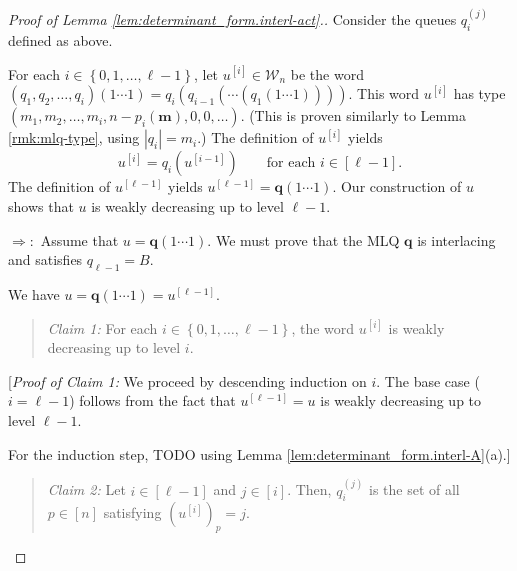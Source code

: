 \documentclass[reqno]{amsart}
\newcommand{\0}{\phantom{c}}
\newenvironment{statement}{\begin{quote}}{\end{quote}}
\theoremstyle{plain}
\theoremstyle{definition}
\numberwithin{equation}{section}
\begin{document}
\begin{proof}
[Proof of Lemma \ref{lem:determinant_form.interl-act}.]Consider the queues
$q_{i}^{\left(  j\right)  }$ defined as above.

For each $i\in\left\{  0,1,\ldots,\ell-1\right\}  $, let $u^{\left[  i\right]
}\in\mathcal{W}_{n}$ be the word $\left(  q_{1},q_{2},\ldots,q_{i}\right)
\left(  1\cdots1\right)  =q_{i}\left(  q_{i-1}\left(  \cdots\left(
q_{1}\left(  1\cdots1\right)  \right)  \right)  \right)  $. This word
$u^{\left[  i\right]  }$ has type $\left(  m_{1},m_{2},\ldots,m_{i}%
,n-p_{i}\left(  \mathbf{m}\right)  ,0,0,\ldots\right)  $. (This is proven
similarly to Lemma \ref{rmk:mlq-type}, using $\left\vert q_{i}\right\vert
=m_{i}$.) The definition of $u^{\left[  i\right]  }$ yields%
\begin{equation}
u^{\left[  i\right]  }=q_{i}\left(  u^{\left[  i-1\right]  }\right)
\qquad\text{for each }i\in\left[  \ell-1\right]
.\label{pf.lem:determinant_form.interl-act.rec}%
\end{equation}
The definition of $u^{\left[  \ell-1\right]  }$ yields $u^{\left[
\ell-1\right]  }=\mathbf{q}\left(  1\cdots1\right)  $. Our construction of $u$
shows that $u$ is weakly decreasing up to level $\ell-1$.

$\Longrightarrow:$ Assume that $u=\mathbf{q}\left(  1\cdots1\right)  $. We
must prove that the MLQ $\mathbf{q}$ is interlacing and satisfies $q_{\ell
-1}=B$.

We have $u=\mathbf{q}\left(  1\cdots1\right)  =u^{\left[  \ell-1\right]  }$.

\begin{statement}
\textit{Claim 1:} For each $i\in\left\{  0,1,\ldots,\ell-1\right\}  $, the
word $u^{\left[  i\right]  }$ is weakly decreasing up to level $i$.
\end{statement}

[\textit{Proof of Claim 1:} We proceed by descending induction on $i$. The
base case ($i=\ell-1$) follows from the fact that $u^{\left[  \ell-1\right]
}=u$ is weakly decreasing up to level $\ell-1$.

For the induction step, TODO using Lemma \ref{lem:determinant_form.interl-A}(a).]

\begin{statement}
\textit{Claim 2:} Let $i\in\left[  \ell-1\right]  $ and $j\in\left[  i\right]
$. Then, $q_{i}^{\left(  j\right)  }$ is the set of all $p\in\left[  n\right]
$ satisfying $\left(  u^{\left[  i\right]  }\right)  _{p}=j$.
\end{statement}


\end{proof}
\end{document}
